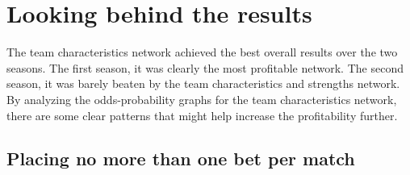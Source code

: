 \section{Looking behind the results}

The team characteristics network achieved the best overall results over the two seasons. The first season, it was clearly the most profitable network. The second season, it was barely beaten by the team characteristics and strengths network. By analyzing the odds-probability graphs for the team characteristics network, there are some clear patterns that might help increase the profitability further.


\subsection{Placing no more than one bet per match}

